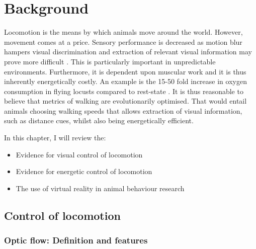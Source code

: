 \chapter{Background}
\label{chap:background}
\vspace{4cm}
Locomotion is the means by which animals move around the world. However, movement comes at a price. Sensory performance is decreased as motion blur hampers visual discrimination \autocites{Kramer2001, Land1999} and extraction of relevant visual information may prove more difficult \autocite{Land1999}. This is particularly important in unpredictable environments. Furthermore, it is dependent upon muscular work and it is thus inherently energetically costly. An example is the 15-50 fold increase in oxygen consumption in flying locusts compared to rest-state \autocite{Krogh1949TheFlight}.
It is thus reasonable to believe that metrics of walking are evolutionarily optimised. That would entail animals choosing walking speeds that allows extraction of visual information, such as distance cues, whilst also being energetically efficient. \\
\vspace{1cm}



In this chapter, I will review the:
\begin{itemize}[noitemsep]
    \item Evidence for visual control of locomotion
    \item Evidence for energetic control of locomotion
    \item The use of virtual reality in animal behaviour research
\end{itemize}

\vfill
\clearpage
\section{Control of locomotion}

\subsection{Optic flow: Definition and features}


